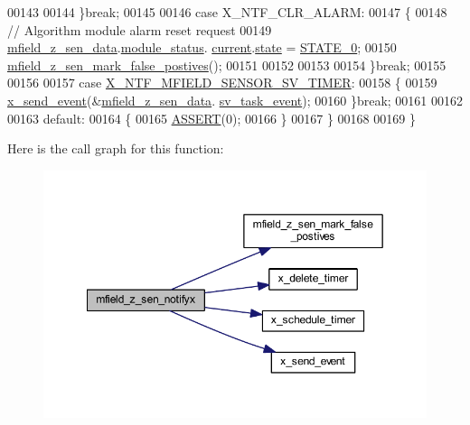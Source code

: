 \begin{DoxyCode}
00143 
00144         \}\textcolor{keywordflow}{break};
00145 
00146          \textcolor{keywordflow}{case} X\_NTF\_CLR\_ALARM:
00147         \{
00148            \textcolor{comment}{// Algorithm module alarm reset request}
00149              \hyperlink{a00053_ae42bea09c571df9fad890518725d5cf4}{mfield\_z\_sen\_data}.\hyperlink{a00027_adfab5a5d8b45a93dfb13edb24e2b80e3}{module\_status}.
      \hyperlink{a00019_acf41ffc11da291c2f9f0fcb02ee72b98}{current}.\hyperlink{a00019_a6b8d8e916bc56265a3fd279bd26b6d1b}{state} = \hyperlink{a00021_ad6739dbbe5581cac99b7dc8a5e09949c}{STATE\_0};
00150              \hyperlink{a00053_acd2adf617d062b1d3dfc9df79aa2ad32}{mfield\_z\_sen\_mark\_false\_postives}();
00151 
00152 
00153 
00154         \}\textcolor{keywordflow}{break};
00155 
00156 
00157         \textcolor{keywordflow}{case} \hyperlink{a00025_ad9eede821e7c65d58f1806af4bd6bf29}{X\_NTF\_MFIELD\_SENSOR\_SV\_TIMER}:
00158         \{
00159            \hyperlink{a00036_a4bc3d03c8d62c8237329ed4e969fbc1b}{x\_send\_event}(&\hyperlink{a00053_ae42bea09c571df9fad890518725d5cf4}{mfield\_z\_sen\_data}.
      \hyperlink{a00027_a43c345f39ea3aefbb60ef1ef57fe5d83}{sv\_task\_event});
00160         \}\textcolor{keywordflow}{break};
00161 
00162 
00163         \textcolor{keywordflow}{default}:
00164         \{
00165             \hyperlink{a00072_abb8ff8e213ac9f6fb21d2b968583b936}{ASSERT}(0);
00166         \}
00167     \}
00168 
00169 \}
\end{DoxyCode}


Here is the call graph for this function\+:\nopagebreak
\begin{figure}[H]
\begin{center}
\leavevmode
\includegraphics[width=349pt]{dc/dee/a00053_a2008fa1563c740e4f6c7e1179675f1f7_cgraph}
\end{center}
\end{figure}


